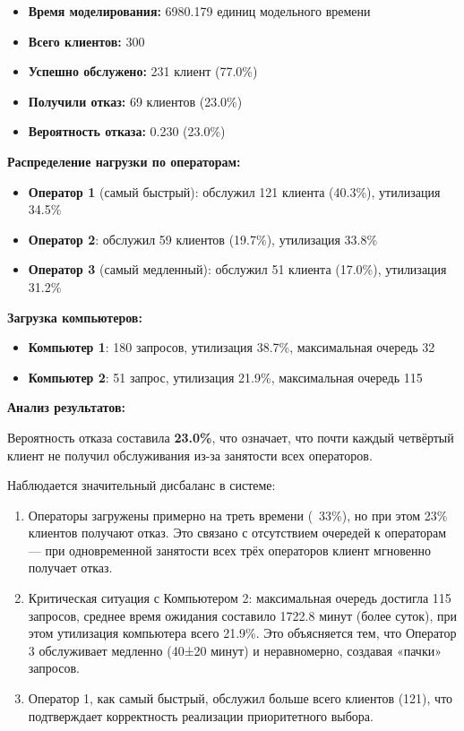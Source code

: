 \begin{itemize}
    \item \textbf{Время моделирования:} 6980.179 единиц модельного времени
    \item \textbf{Всего клиентов:} 300
    \item \textbf{Успешно обслужено:} 231 клиент (77.0\%)
    \item \textbf{Получили отказ:} 69 клиентов (23.0\%)
    \item \textbf{Вероятность отказа:} 0.230 (23.0\%)
\end{itemize}

\textbf{Распределение нагрузки по операторам:}

\begin{itemize}
    \item \textbf{Оператор 1} (самый быстрый): обслужил 121 клиента (40.3\%), утилизация 34.5\%
    \item \textbf{Оператор 2}: обслужил 59 клиентов (19.7\%), утилизация 33.8\%
    \item \textbf{Оператор 3} (самый медленный): обслужил 51 клиента (17.0\%), утилизация 31.2\%
\end{itemize}

\textbf{Загрузка компьютеров:}

\begin{itemize}
    \item \textbf{Компьютер 1}: 180 запросов, утилизация 38.7\%, максимальная очередь 32
    \item \textbf{Компьютер 2}: 51 запрос, утилизация 21.9\%, максимальная очередь 115
\end{itemize}

\textbf{Анализ результатов:}

Вероятность отказа составила \textbf{23.0\%}, что означает, что почти каждый четвёртый клиент не получил обслуживания из-за занятости всех операторов.

Наблюдается значительный дисбаланс в системе:

\begin{enumerate}
    \item Операторы загружены примерно на треть времени (~33\%), но при этом 23\% клиентов получают отказ. Это связано с отсутствием очередей к операторам — при одновременной занятости всех трёх операторов клиент мгновенно получает отказ.

    \item Критическая ситуация с Компьютером 2: максимальная очередь достигла 115 запросов, среднее время ожидания составило 1722.8 минут (более суток), при этом утилизация компьютера всего 21.9\%. Это объясняется тем, что Оператор 3 обслуживает медленно (40±20 минут) и неравномерно, создавая «пачки» запросов.

    \item Оператор 1, как самый быстрый, обслужил больше всего клиентов (121), что подтверждает корректность реализации приоритетного выбора.
\end{enumerate}

